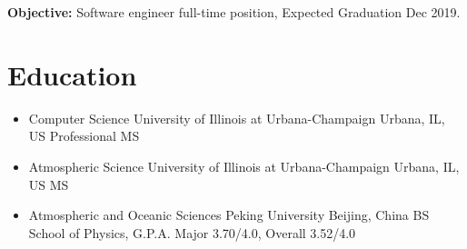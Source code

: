 \documentclass[11pt,a4paper,sans]{moderncv}        %
\begin{document}
\makecvtitle

\vspace{-40pt}
\begin{center}
	\textbf{Objective:} Software engineer full-time position, Expected Graduation Dec 2019.
\end{center}
\vspace{-20pt}
\section{Education}
\vspace{-5pt}
\begin{itemize}
	\item {
	      {Computer Science}
	      {University of Illinois at Urbana-Champaign}
	      {Urbana, IL, US}
	      {Professional MS}
	      {}
	      }
	      
	\item {
	      {Atmospheric Science}
	      {University of Illinois at Urbana-Champaign}
	      {Urbana, IL, US}
	      {MS}
	      {}
	      }
	      
	\item {
	      {Atmospheric and Oceanic Sciences}
	      {Peking University}
	      {Beijing, China}
	      {BS}
	      {School of Physics, G.P.A. Major 3.70/4.0, Overall 3.52/4.0}
	      }
\end{itemize}

\vspace{-15pt}
\end{document}

